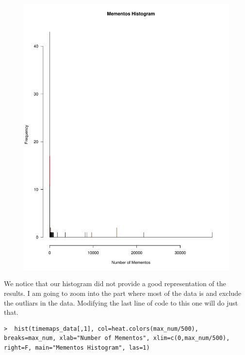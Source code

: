 \documentclass[a4paper, 11pt]{article}
\begin{document}
\begin{figure}[H]
\centering
\includegraphics[scale=0.7]{hist1.pdf}
\end{figure}
\pagebreak

We notice that our histogram did not provide a good representation of the results. I am going to zoom into the part where most of the data is and exclude the outliars in the data. Modifying the last line of code to this one will do just that.

\begin{lstlisting}
>  hist(timemaps_data[,1], col=heat.colors(max_num/500), breaks=max_num, xlab="Number of Mementos", xlim=c(0,max_num/500), right=F, main="Mementos Histogram", las=1)
\end{lstlisting}
\end{document}
